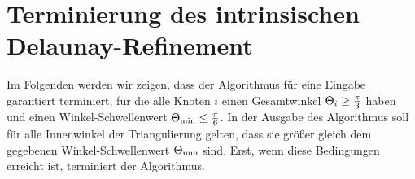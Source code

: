 \chapter{ Terminierung des intrinsischen Delaunay-Refinement}
\label{kap:Terminierung}





Im Folgenden werden wir zeigen, dass der Algorithmus für eine Eingabe garantiert terminiert, für die alle Knoten $i$ einen Gesamtwinkel $\gesamtwinkel*\geq \frac{\pi}{3}$ haben und einen Winkel-Schwellenwert $\kleinsterWinkel* \leq \frac{\pi}{6}$. In der Ausgabe des Algorithmus soll für alle Innenwinkel der Triangulierung gelten, dass sie größer gleich dem gegebenen Winkel-Schwellenwert $\kleinsterWinkel*$ sind. Erst, wenn diese Bedingungen erreicht ist, terminiert der Algorithmus.










